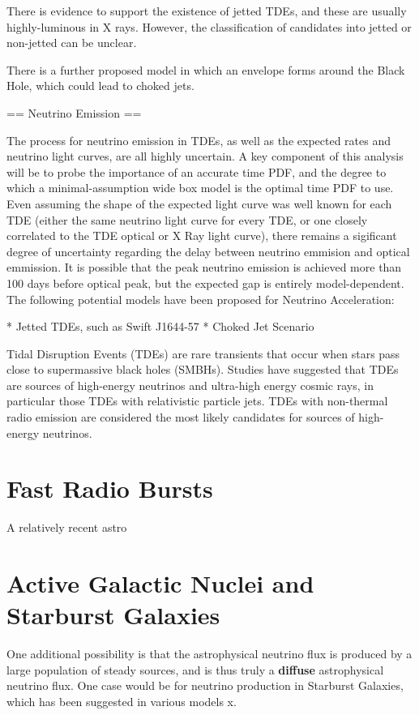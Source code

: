 There is evidence to support the existence of jetted TDEs, and these are usually highly-luminous in X rays. However, the classification of candidates into jetted or non-jetted can be unclear.

There is a further proposed model in which an envelope forms around the Black Hole, which could lead to choked jets.

== Neutrino Emission ==

The process for neutrino emission in TDEs, as well as the expected rates and neutrino light curves, are all highly uncertain. A key component of this analysis will be to probe the importance of an accurate time PDF, and the degree to which a minimal-assumption wide box model is the optimal time PDF to use. Even assuming the shape of the expected light curve was well known for each TDE (either the same neutrino light curve for every TDE,  or one closely correlated to the TDE optical or X Ray light curve), there remains a sigificant degree of uncertainty regarding the delay between neutrino emmision and optical emmission. It is possible that the peak neutrino emission is achieved more than 100 days before optical peak, but the expected gap is entirely model-dependent. The following potential models have been proposed for Neutrino Acceleration:

* Jetted TDEs, such as Swift J1644-57
* Choked Jet Scenario

Tidal Disruption Events (TDEs) are rare transients that occur when stars pass close to supermassive black holes (SMBHs). Studies have suggested that TDEs are sources of high-energy neutrinos and ultra-high energy cosmic rays\cite{2009ApJ...693..329F,2017MNRAS.469.1354D}, in particular those TDEs with relativistic particle jets\cite{2014arXiv1411.0704F,2017ApJ...838....3S,2016PhRvD..93h3005W,2017PhRvD..95l3001L}. TDEs with non-thermal radio emission are considered the most likely candidates for sources of high-energy neutrinos.

\section{Fast Radio Bursts}

A relatively recent astro

\section{Active Galactic Nuclei and Starburst Galaxies}
One additional possibility is that the astrophysical neutrino flux is produced by a large population of steady sources, and is thus truly a \textbf{diffuse} astrophysical neutrino flux. One case would be for neutrino production in Starburst Galaxies, which has been suggested in various models x.

